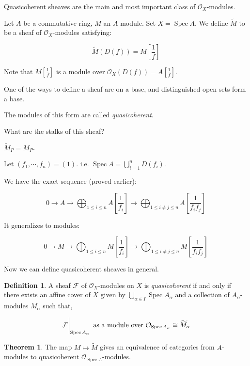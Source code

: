 \documentclass{article}
\theoremstyle{definition}
\newtheorem*{definition}{Definition}
\newtheorem{theorem}{Theorem}
\begin{document}
    Quasicoherent sheaves are the main and most important class of \(\mathcal{O}_X\)-modules.

    Let \(A\) be a commutative ring, \(M\) an \(A\)-module. Set \(X = \operatorname{Spec} A\). We define \(\widetilde{M}\) to be a sheaf of \(\mathcal{O}_X\)-modules satisfying:
    
    \[
        \widetilde{M}(D(f)) = M \left[ \frac{1}{f} \right]
    \]

    Note that \(M \left[ \frac{1}{f} \right] \) is a module over \(\mathcal{O}_X(D(f)) = A \left[ \frac{1}{f} \right]\).

    One of the ways to define a sheaf are on a base, and distinguished open sets form a base.

    The modules of this form are called \textit{quasicoherent}.

    What are the stalks of this sheaf?

    \(\widetilde{M}_P = M_P\).

    Let \((f_1, \cdots , f_n) = (1)\). i.e. \(\operatorname{Spec} A = \bigcup_{i=1}^n D(f_i) \).

    We have the exact sequence (proved earlier):

    \[
        0 \to A \to \bigoplus_{1 \leq i \leq n} A \left[ \frac{1}{f_i} \right] \to \bigoplus_{1 \leq i \neq j \leq n} A \left[ \frac{1}{f_i f_j} \right]  
    \]

    It generalizes to modules:

    \[
        0 \to M \to \bigoplus_{1 \leq i \leq n} M \left[ \frac{1}{f_i} \right] \to \bigoplus_{1 \leq i \neq j \leq n} M \left[ \frac{1}{f_i f_j} \right]  
    \]

    Now we can define quasicoherent sheaves in general.

    \begin{definition}
        A sheaf \(\mathcal{F}\) of \(\mathcal{O}_X\)-modules on \(X\) is \textit{quasicoherent} if and only if there exists an affine cover of \(X\) given by \(\bigcup_{\alpha \in I} \operatorname{Spec} A_\alpha\) and a collection of \(A_\alpha\)-modules \(M_\alpha\) such that,

        \[
            \eval{\mathcal{F}}_{\operatorname{Spec} A_\alpha} \text{ as a module over } \mathcal{O}_{\operatorname{Spec} A_\alpha} \cong \widetilde{M}_\alpha
        \]
    \end{definition}

    \begin{theorem}
        The map \(M \mapsto \widetilde{M}\) gives an equivalence of categories from \(A\)-modules to quasicoherent \(\mathcal{O}_{\operatorname{Spec} A}\)-modules. 
    \end{theorem}
\end{document}
